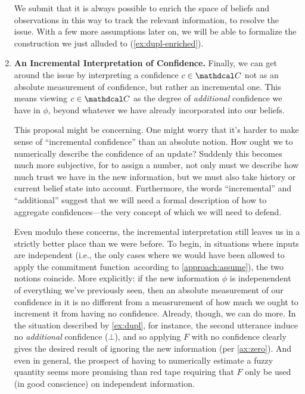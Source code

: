 \documentclass{uai2023}
\theoremstyle{plain}
\theoremstyle{definition}
\newcommand\cofunc{commitment function}
\newcommand\confdom{\mathdcal C}
\begin{document}
\begin{enumerate}[label={\textbf{I\arabic*.}},ref={I\arabic*}]
	We submit that it is always possible to enrich the space of beliefs and observations in this way to track the relevant information, to resolve the issue.
	With a few more assumptions later on, we will be able to formalize the construction we just alluded to (\cref{ex:dupl-enriched}).

	\item \textbf{An Incremental Interpretation of Confidence.}
		\label{approach:interperet}
	Finally, we can get around the issue by interpreting a confidence $c \in \confdom$ not as an absolute measurement of confidence, but rather an incremental one.  This means viewing $c \in \confdom$ as the degree of \emph{additional} confidence we have in $\phi$, beyond whatever we have already incorporated into our beliefs.

This proposal might be concerning.
One might worry that it's harder to make sense of ``incremental confidence'' than an absolute notion.
	How ought we to numerically describe the confidence of an update?
	Suddenly this becomes much more subjective, for to assign a number, not only must we describe how much trust we have in the new information, but we must also take history or current belief state into account.
	Furthermore, the words ``incremental'' and ``additional'' suggest that we will need a formal description of how to aggregate confidences---the very concept of which we will need to defend.


	Even modulo these concerns, the incremental interpretation still leaves us in a strictly better place than we were before.
To begin, in situations where inputs are independent (i.e., the only cases where we would have been allowed to apply the \cofunc\ according to \cref{approach:assume}), the two notions coincide.
	More explicitly: if the new information $\phi$ is indepenendent of everything we've previously seen, then an absolute measurement of our confidence in it is no different from a measrurement of how much we ought to increment it from having no confidence.
	Already, though, we can do more.
	In the situation described by \cref{ex:dupl}, for instance,
	the second utterance induce no \emph{additional} confidence ($\bot$), and so applying $F$ with no confidence clearly gives the desired result of ignoring the new information (per \cref{ax:zero}).
And even in general, the prospect of having to numerically estimate a fuzzy quantity seems more promising than red tape requiring that $F$ only be used (in good conscience) on independent information.


\end{enumerate}
\end{document}
